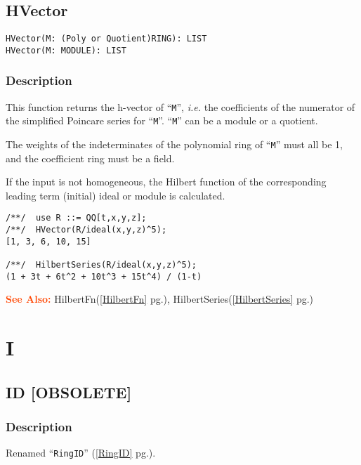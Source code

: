 \documentclass[a4paper]{mybook}
\newenvironment{command}{}{} %
\newcommand\SeeAlso{\par\textcolor{OrangeRed}{\textbf{\large See Also: }}}
\begin{document}
\section{HVector}
\label{HVector}
\begin{command} %


\begin{Verbatim}[label=syntax, rulecolor=\color{MidnightBlue},
frame=single]
HVector(M: (Poly or Quotient)RING): LIST
HVector(M: MODULE): LIST
\end{Verbatim}


\subsection*{Description}

This function returns the h-vector of ``\verb&M&'', \textit{i.e.} the coefficients of the
numerator of the simplified Poincare series for ``\verb&M&''.  ``\verb&M&'' can be a
module or a quotient.
\par 
The weights of the indeterminates of the polynomial ring of ``\verb&M&'' must all
be 1, and the coefficient ring must be a field.
\par 
If the input is not homogeneous, the Hilbert function of the
corresponding leading term (initial) ideal or module is calculated.
\begin{Verbatim}[label=example, rulecolor=\color{PineGreen}, frame=single]
/**/  use R ::= QQ[t,x,y,z];
/**/  HVector(R/ideal(x,y,z)^5);
[1, 3, 6, 10, 15]

/**/  HilbertSeries(R/ideal(x,y,z)^5);
(1 + 3t + 6t^2 + 10t^3 + 15t^4) / (1-t)
\end{Verbatim}


\SeeAlso %
  HilbertFn(\ref{HilbertFn} pg.\pageref{HilbertFn}), 
    HilbertSeries(\ref{HilbertSeries} pg.\pageref{HilbertSeries})
\end{command} %

\chapter{I}  %
\label{I}

\section{ID [OBSOLETE]}
\label{ID [OBSOLETE]}
\begin{command} %



\subsection*{Description}

Renamed ``\verb&RingID&'' (\ref{RingID} pg.\pageref{RingID}).

\end{command} %
\end{document}
